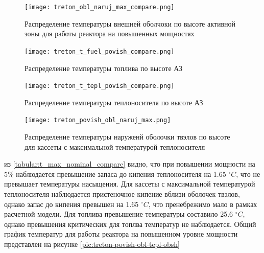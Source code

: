 \begin{figure}[H]
	\begin{center}
		\texttt{[image: treton\_obl\_naruj\_max\_compare.png]}
		\caption{Распределение температуры внешней оболчоки по высоте активной зоны для работы реактора на повышенных мощностях }
		\label{pic:treton-obl-naruj-max-compare} %
	\end{center}
\end{figure}

\begin{figure}[H]
	\begin{center}
		\texttt{[image: treton\_t\_fuel\_povish\_compare.png]}
		\caption{Распределение температуры топлива по высоте АЗ}
		\label{pic:treton-t-fuel-povish-compare} %
	\end{center}
\end{figure}

\begin{figure}[H]
	\begin{center}
		\texttt{[image: treton\_t\_tepl\_povish\_compare.png]}
		\caption{Распределение температуры теплоносителя по высоте АЗ}
		\label{pic:treton-t-tepl-povish-compare} %
	\end{center}
\end{figure}

\begin{figure}[H]
	\begin{center}
		\texttt{[image: treton\_povish\_obl\_naruj\_max.png]}
		\caption{Распределение температуры наруженй оболочки твэлов по высоте для кассеты с максимальной температурой теплоносителя}
		\label{pic:treton-povish-obl-naruj-max} %
	\end{center}
\end{figure}

из \ref{tabular:t_max_nominal_compare} видно, что при повышении мощности на 5\% наблюдается превышение запаса до кипения теплоносителя на 1.65 $^\circ C$, что не превышает температуры насыщения. Для кассеты с максимальной температурой теплоносителя наблюдается пристеночное кипение вблизи оболочек твэлов, однако запас до кипения превышен на 1.65 $^\circ C$, что пренебрежимо мало в рамках расчетной модели.
Для топлива превышение температуры составило 25.6 $^\circ C$, однако превышения критических для топлва температур не наблюдается. Общий график температур для работы реактора на повышенном уровне мощности представлен на рисунке \ref{pic:treton-povish-obl-tepl-obsh}


